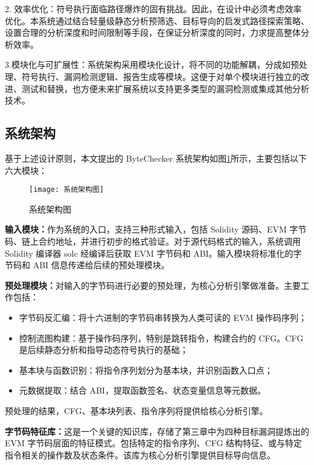 \documentclass[print, master, vlined, timesmath]{DissertUESTC}
\begin{document}
2. 效率优化：符号执行面临路径爆炸的固有挑战。因此，在设计中必须考虑效率优化。本系统通过结合轻量级静态分析预筛选、目标导向的启发式路径探索策略、设置合理的分析深度和时间限制等手段，在保证分析深度的同时，力求提高整体分析效率。

3.模块化与可扩展性：系统架构采用模块化设计，将不同的功能解耦，分成如预处理、符号执行、漏洞检测逻辑、报告生成等模块。这便于对单个模块进行独立的改进、测试和替换，也方便未来扩展系统以支持更多类型的漏洞检测或集成其他分析技术。

\subsection{系统架构}

基于上述设计原则，本文提出的 ByteChecker 系统架构如图\ref{fig:系统架构图}所示，主要包括以下六大模块：

\begin{figure}[htbp]
    \centering
    \texttt{[image: 系统架构图]}
    \caption{系统架构图}
    \label{fig:系统架构图}
\end{figure}


\textbf{输入模块：}作为系统的入口，支持三种形式输入，包括 Solidity 源码、EVM 字节码、链上合约地址，并进行初步的格式验证。对于源代码格式的输入，系统调用 Solidity 编译器 solc 经编译后获取 EVM 字节码和 ABI。输入模块将标准化的字节码和 ABI 信息传递给后续的预处理模块。

\textbf{预处理模块：}对输入的字节码进行必要的预处理，为核心分析引擎做准备。主要工作包括： 

\begin{itemize}
    \item 字节码反汇编：将十六进制的字节码串转换为人类可读的 EVM 操作码序列；
    \item 控制流图构建：基于操作码序列，特别是跳转指令，构建合约的 CFG。CFG 是后续静态分析和指导动态符号执行的基础；
    \item 基本块与函数识别：将指令序列划分为基本块，并识别函数入口点；
    \item 元数据提取：结合 ABI，提取函数签名、状态变量信息等元数据。
\end{itemize}
预处理的结果，CFG、基本块列表、指令序列将提供给核心分析引擎。

\textbf{字节码特征库：}这是一个关键的知识库，存储了第三章中为四种目标漏洞提炼出的 EVM 字节码层面的特征模式。包括特定的指令序列、CFG 结构特征、或与特定指令相关的操作数及状态条件。该库为核心分析引擎提供目标导向信息。
\end{document}
